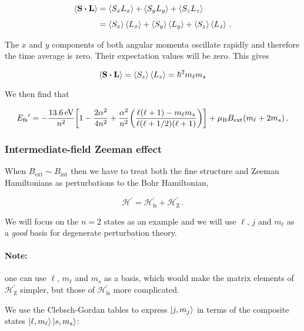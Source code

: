 \documentclass[12pt, titlepage]{article}
\newcommand{\exv}[1]{\left\langle #1 \right\rangle}
\begin{document}
\begin{align}
	\exv{\vb{S}\vdot\vb{L}} &= \exv{S_xL_x} + \exv{S_yL_y} + \exv{S_zL_z} \nonumber \\[4pt]
	&= \exv{S_x}\exv{L_x} + \exv{S_y}\exv{L_y} + \exv{S_z}\exv{L_z} \,.
\end{align}

The $x$ and $y$ components of both angular momenta oscillate rapidly and therefore the time average is zero. Their expectation values will be zero. This gives

\begin{equation}
	\exv{\vb{S}\vdot\vb{L}} = \exv{S_z}\exv{L_z} = \hbar^2m_\ell m_s
\end{equation}

We then find that

\begin{equation}
	{E_\text{fs}}^\prime = -\frac{\SI{13.6}{\eV}}{n^2}\qty[1 - \frac{2\alpha^2}{4n^2} + \frac{\alpha^2}{n^2}\qty(\frac{\ell(\ell+1) - m_\ell m_s}{\ell(\ell+1/2)(\ell+1)})] + \mu_\text{B}B_\text{ext}(m_\ell + 2m_s) \,.
\end{equation}

\subsubsection*{Intermediate-field Zeeman effect}
When $B_\text{ext} \sim B_\text{int}$ then we have to treat both the fine structure and Zeeman Hamiltonians as perturbations to the Bohr Hamiltonian,

\begin{equation}
	\mathcal{H}^\prime = \mathcal{H}_\text{fs}^\prime + \mathcal{H}_\text{Z}^\prime \,.
\end{equation}

We will focus on the $n=2$ states as an example and we will use $\ell$, $j$ and $m_\ell$ as a \textit{good} basis for degenerate perturbation theory. 

\begin{mdframed}
\paragraph*{Note:} one can use $\ell$, $m_\ell$ and $m_s$ as a basis, which would make the matrix elements of $\mathcal{H}_\text{Z}^\prime$ simpler, but those of $\mathcal{H}_\text{fs}^\prime$ more complicated.
\end{mdframed}

We use the Clebsch-Gordan tables to express $\ket{j, m_j}$ in terms of the composite states $\ket{\ell,m_\ell}\ket{s,m_s}$:
\end{document}
